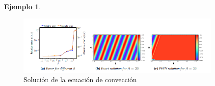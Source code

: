 \documentclass[a4paper,11pt,spanish, twoside, leqno]{tfg-uam}
\theoremstyle{definition}
\newtheorem{exmp}[teor]{Ejemplo}
\begin{document}
\begin{mdframed}
\begin{exmp}
        \begin{figure}[H]
            \centering
            \includegraphics[width=0.9\textwidth]{Figuras/error_PINN_temporal.png}
            \caption{Solución de la ecuación de convección}
            \label{fig:error_PINN_temporal}
        \end{figure}

    \end{exmp}
\end{mdframed}

\printbibliography
\cleardoublepage
\end{document}
